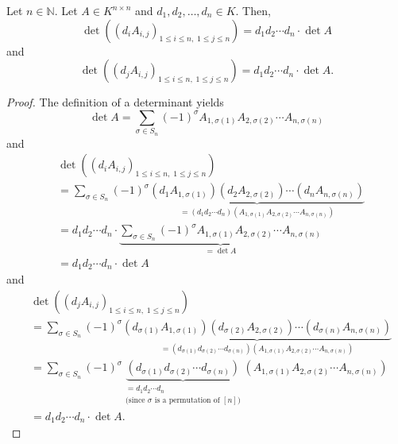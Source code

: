 \begin{corollary}
\label{cor.det.scale-row-col}
\leantarget
\leanok
Let $n \in \mathbb{N}$. Let $A \in K^{n \times n}$ and
$d_1, d_2, \ldots, d_n \in K$. Then,
\begin{equation}
  \det\left( \left( d_i A_{i,j} \right)_{1 \leq i \leq n,\; 1 \leq j \leq n} \right)
  = d_1 d_2 \cdots d_n \cdot \det A
  \label{eq.cor.det.scale-row-col.row}
\end{equation}
and
\begin{equation}
  \det\left( \left( d_j A_{i,j} \right)_{1 \leq i \leq n,\; 1 \leq j \leq n} \right)
  = d_1 d_2 \cdots d_n \cdot \det A.
  \label{eq.cor.det.scale-row-col.col}
\end{equation}
\end{corollary}

\begin{proof}
\leanok
The definition of a determinant yields
\[
  \det A = \sum_{\sigma \in S_n} (-1)^{\sigma}
  A_{1,\sigma(1)} A_{2,\sigma(2)} \cdots A_{n,\sigma(n)}
\]
and
\begin{align*}
  &\det\left( \left( d_i A_{i,j} \right)_{1 \leq i \leq n,\; 1 \leq j \leq n} \right) \\
  &= \sum_{\sigma \in S_n} (-1)^{\sigma}
     \underbrace{(d_1 A_{1,\sigma(1)})(d_2 A_{2,\sigma(2)}) \cdots (d_n A_{n,\sigma(n)})}_{
       = (d_1 d_2 \cdots d_n)(A_{1,\sigma(1)} A_{2,\sigma(2)} \cdots A_{n,\sigma(n)})} \\
  &= d_1 d_2 \cdots d_n \cdot
     \underbrace{\sum_{\sigma \in S_n} (-1)^{\sigma}
       A_{1,\sigma(1)} A_{2,\sigma(2)} \cdots A_{n,\sigma(n)}}_{= \det A} \\
  &= d_1 d_2 \cdots d_n \cdot \det A
\end{align*}
and
\begin{align*}
  &\det\left( \left( d_j A_{i,j} \right)_{1 \leq i \leq n,\; 1 \leq j \leq n} \right) \\
  &= \sum_{\sigma \in S_n} (-1)^{\sigma}
     \underbrace{(d_{\sigma(1)} A_{1,\sigma(1)})(d_{\sigma(2)} A_{2,\sigma(2)})
       \cdots (d_{\sigma(n)} A_{n,\sigma(n)})}_{
       = (d_{\sigma(1)} d_{\sigma(2)} \cdots d_{\sigma(n)})
         (A_{1,\sigma(1)} A_{2,\sigma(2)} \cdots A_{n,\sigma(n)})} \\
  &= \sum_{\sigma \in S_n} (-1)^{\sigma}
     \underbrace{(d_{\sigma(1)} d_{\sigma(2)} \cdots d_{\sigma(n)})}_{\substack{
       = d_1 d_2 \cdots d_n \\
       \text{(since } \sigma \text{ is a permutation of } [n] \text{)}}}
     (A_{1,\sigma(1)} A_{2,\sigma(2)} \cdots A_{n,\sigma(n)}) \\
  &= d_1 d_2 \cdots d_n \cdot \det A.
\end{align*}
\end{proof}

